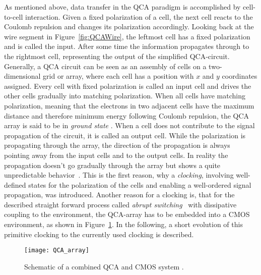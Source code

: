As mentioned above, data transfer in the QCA paradigm is accomplished by cell-to-cell interaction. Given a fixed polarization of a cell, the next cell reacts to the Coulomb repulsion and changes its polarization accordingly. Looking back at the wire segment in Figure~\ref{fig:QCAWire}, the leftmost cell has a fixed polarization and is called the input. After some time the information propagates through to the rightmost cell, representing the output of the simplified QCA-circuit. Generally, a QCA circuit can be seen as an assembly of cells on a two-dimensional grid or array, where each cell has a position with $x$ and $y$ coordinates assigned. Every cell with fixed polarization is called an input cell and drives the other cells gradually into matching polarization. When all cells have matching polarization, meaning that the electrons in two adjacent cells have the maximum distance and therefore minimum energy following Coulomb repulsion, the QCA array is said to be in \emph{ground state} \cite{lent1997device}. When a cell does not contribute to the signal propagation of the circuit, it is called an output cell. While the polarization is propagating through the array, the direction of the propagation is always pointing away from the input cells and to the output cells. In reality the propagation doesn't go gradually through the array but shows a quite unpredictable behavior~\cite{lent1994quantum}. This is the first reason, why a \textit{clocking}, involving well-defined states for the polarization of the cells and enabling a well-ordered signal propagation, was introduced. Another reason for a clocking is, that for the described straight forward process called \emph{abrupt switching}~\cite{lent1997device} with dissipative coupling to the environment, the QCA-array has to be embedded into a CMOS environment, as shown in Figure~\ref{fig:QCA_array}. In the following, a short evolution of this primitive clocking to the currently used clocking is described.

\begin{figure}
	\centering
	\texttt{[image: QCA\_array]}
	\caption{Schematic of a combined QCA and CMOS system \cite{lent1994quantum}.} 
	\label{fig:QCA_array}
\end{figure}


